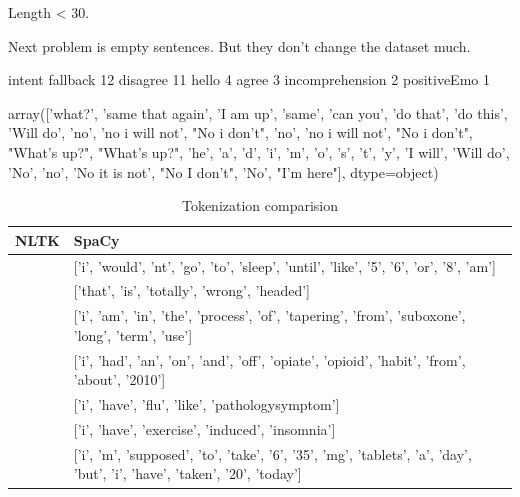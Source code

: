 \documentclass[11pt]{article}
\begin{document}
Length < 30.


Next problem is empty sentences. But they don't change the dataset much.

intent
fallback           12
disagree           11
hello               4
agree               3
incomprehension     2
positiveEmo         1

array(['what?', 'same that again', 'I am up', 'same', 'can you',
       'do that', 'do this', 'Will do', 'no', 'no i will not',
       "No i don't", 'no', 'no i will not', "No i don't", "What's up?",
       "What's up?", 'he', 'a', 'd', 'i', 'm', 'o', 's', 't', 'y',
       'I will', 'Will do', 'No', 'no', 'No it is not', "No I don't",
       'No', "I'm here"], dtype=object)

\begin{center}
\begin{table}
\begin{tabular}{ |p{7cm}|p{7cm}| }
\hline
NLTK & SpaCy \\ \hline
['i', 'wouldnt', 'go', 'to', 'sleep', 'until', 'like', '5', '6', 'or', '8am'] & 
['i', 'would', 'nt', 'go', 'to', 'sleep', 'until', 'like', '5', '6', 'or', '8', 'am'] \\ \hline
['that', 'is', 'totally', 'wrongheaded'] & ['that', 'is', 'totally', 'wrong', 'headed'] \\ \hline
['i', 'am', 'in', 'the', 'process', 'of', 'tapering', 'from', 'suboxone', 'longterm', 'use'] & 
['i', 'am', 'in', 'the', 'process', 'of', 'tapering', 'from', 'suboxone', 'long', 'term', 'use'] \\ \hline
['i', 'had', 'an', 'onandoff', 'opiateopioid', 'habit', 'from', 'about', '2010'] & 
['i', 'had', 'an', 'on', 'and', 'off', 'opiate', 'opioid', 'habit', 'from', 'about', '2010'] \\ 
\hline
['i', 'have', 'flulike', 'pathologysymptom'] & ['i', 'have', 'flu', 'like', 'pathologysymptom'] \\ \hline
['i', 'have', 'exerciseinduced', 'insomnia'] & ['i', 'have', 'exercise', 'induced', 'insomnia'] \\ \hline
['i', 'm', 'supposed', 'to', 'take', '6', '35mg', 'tablets', 'a', 'day', 'but', 'i', 'have', 'taken', '20', 'today'] & 
['i', 'm', 'supposed', 'to', 'take', '6', '35', 'mg', 'tablets', 'a', 'day', 'but', 'i', 'have', 'taken', '20', 'today'] \\ 
\hline
\end{tabular}	
\caption{\label{token_dif}Tokenization comparision}
\end{table}
\end{center}
\end{document}
